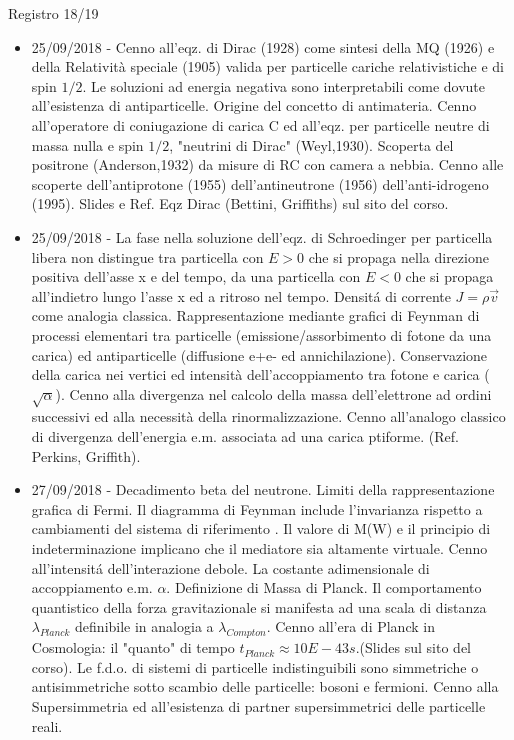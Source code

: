 \begin{frame}[allowframebreaks]{Registro 18/19}
\begin{itemize}
\item 25/09/2018 - Cenno all'eqz. di Dirac (1928) come sintesi della MQ (1926) e della Relatività speciale (1905) valida per particelle cariche relativistiche e di spin $1/2$. Le soluzioni ad energia negativa sono interpretabili come dovute all'esistenza di antiparticelle. Origine del concetto di antimateria. Cenno all'operatore di coniugazione di carica C ed all'eqz. per particelle neutre di massa nulla e spin $1/2$, "neutrini di Dirac" (Weyl,1930). Scoperta del positrone (Anderson,1932) da misure di RC con camera a nebbia. Cenno alle scoperte dell'antiprotone (1955) dell'antineutrone (1956) dell'anti-idrogeno (1995). Slides e Ref. Eqz Dirac (Bettini, Griffiths) sul sito del corso.
\item 25/09/2018 - La fase nella soluzione dell'eqz. di Schroedinger per particella libera non distingue tra particella con $E>0$ che si propaga nella direzione positiva dell'asse x e del tempo, da una particella con $E<0$ che si propaga all'indietro lungo l'asse x ed a ritroso nel tempo. Densit\'a di corrente $J=\rho\vec{v}$ come analogia classica. Rappresentazione mediante grafici di Feynman di processi elementari tra particelle (emissione/assorbimento di fotone da una carica) ed antiparticelle (diffusione e+e- ed annichilazione). Conservazione della carica nei vertici ed intensità dell'accoppiamento tra fotone e carica ($\sqrt{\alpha}$). Cenno alla divergenza nel calcolo della massa dell'elettrone ad ordini successivi ed alla necessità della rinormalizzazione. Cenno all'analogo classico di divergenza dell'energia e.m. associata ad una carica ptiforme. (Ref. Perkins, Griffith).
\item 27/09/2018 - Decadimento beta del neutrone. Limiti della rappresentazione grafica di Fermi. Il diagramma di Feynman include l'invarianza rispetto a cambiamenti del sistema di riferimento . Il valore di M(W) e il principio di indeterminazione implicano che il mediatore sia altamente virtuale. Cenno all'intensit\'a dell'interazione debole. La costante adimensionale di accoppiamento e.m. $\alpha$. Definizione di Massa di Planck. Il comportamento quantistico della forza gravitazionale si manifesta ad una scala di distanza $\lambda_{Planck}$ definibile in analogia a $\lambda_{Compton}$. Cenno all'era di Planck in Cosmologia: il "quanto" di tempo $t_{Planck}\approx10E-43 s$.(Slides sul sito del corso). Le f.d.o. di sistemi di particelle indistinguibili sono simmetriche o antisimmetriche sotto scambio delle particelle: bosoni e fermioni. Cenno alla Supersimmetria ed all'esistenza di partner supersimmetrici delle particelle reali.

\end{itemize}
\end{frame}
